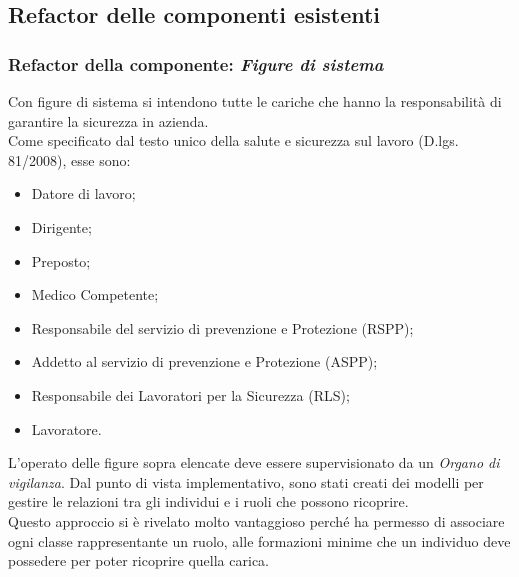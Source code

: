 \subsection{Refactor delle componenti esistenti}
	
	
\subsubsection{Refactor della componente: \textit{Figure di sistema}}
	Con figure di sistema si intendono tutte le cariche che hanno la responsabilità di garantire la sicurezza in azienda. \\
	Come specificato dal testo unico della salute e sicurezza sul lavoro (D.lgs. 81/2008), esse sono: 
	\begin{itemize}
		\item Datore di lavoro;
		\item Dirigente;
		\item Preposto;
		\item Medico Competente;
		\item Responsabile del servizio di prevenzione e Protezione (RSPP);
		\item Addetto al servizio di prevenzione e Protezione (ASPP);
		\item Responsabile dei Lavoratori per la Sicurezza (RLS);
		\item Lavoratore.
	\end{itemize}
	L'operato delle figure sopra elencate deve essere supervisionato da un \textit{Organo di vigilanza}.
	Dal punto di vista implementativo, sono stati creati dei modelli per gestire le relazioni tra gli individui e i ruoli che possono ricoprire. \\
	Questo approccio si è rivelato molto vantaggioso perché ha permesso di associare ogni classe rappresentante un ruolo, alle formazioni minime che un individuo deve possedere per poter ricoprire quella carica. 
